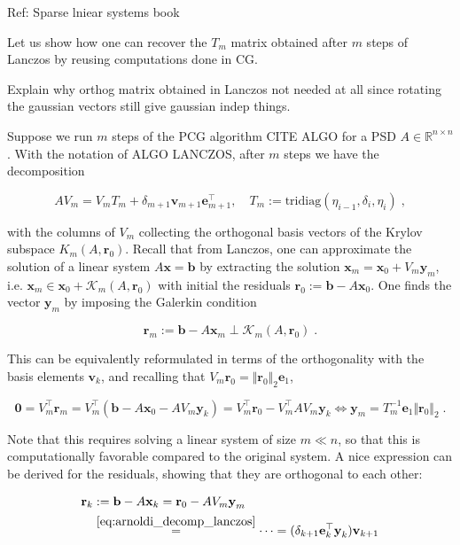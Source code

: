 \documentclass{article}
\newcommand{\vect}[1]{\boldsymbol{\mathbf{#1}}}
\newcommand{\R}{\mathbb R}
\newcommand{\norm}[1]{\Vert #1 \Vert}
\begin{document}
Ref: Sparse lniear systems book


Let us show how one can recover the $T_m$ matrix obtained after $m$ steps of Lanczos by reusing computations done in CG. 

Explain why orthog matrix obtained in Lanczos not needed at all since rotating the gaussian vectors still give gaussian indep things.

Suppose we run $m$ steps of the PCG algorithm CITE ALGO for a PSD $A \in \R^{n\times n}$. With the notation of ALGO LANCZOS, after $m$ steps we have the decomposition

\begin{equation} \label{eq:arnoldi_decomp_lanczos}
    A V_m = V_m T_m + \delta_{m+1} \vect v_{m+1} \vect e_{m+1}^\top, \quad T_m := \text{tridiag}(\eta_{i-1}, \delta_i, \eta_i) \; ,
\end{equation}

with the columns of $V_m$ collecting the orthogonal basis vectors of the Krylov subspace $K_m(A, \vect r_0)$. Recall that from Lanczos, one can approximate the solution of a linear system $A\vect x = \vect b$ by extracting the solution $\vect x_m = \vect x_0 + V_m \vect y_m$, i.e. $\vect x_m \in \vect x_0 + \mathcal K_m(A, \vect r_0)$ with initial the residuals $\vect r_0 := \vect b - A \vect x_0$. One finds the vector $\vect y_m$ by imposing the Galerkin condition 

\begin{equation}
    \vect r_m := \vect b - A \vect x_m \perp \mathcal K_m(A, \vect r_0) \; .
\end{equation}

This can be equivalently reformulated in terms of the orthogonality with the basis elements $\vect v_k$, and recalling that $V_m \vect r_0 = \Vert \vect r_0 \Vert_2 \vect e_1$,

\begin{equation*}
    \vect 0 = V_m^\top \vect r_m = V_m^\top (\vect b - A \vect x_0 - A V_m \vect y_k) = V_m^\top \vect r_0 - V_m^\top A V_m \vect y_k 
    \iff \vect y_m = T_m^{-1} \vect e_1 \norm{\vect r_0}_2 \; .
\end{equation*}

Note that this requires solving a linear system of size $m \ll n$, so that this is computationally favorable compared to the original system. A nice expression can be derived for the residuals, showing that they are orthogonal to each other:

\begin{align}
    \vect r_k &:= \vect b - A \vect x_k = \vect r_0 - A V_m \vect y_m\\
    &\stackrel{\eqref{eq:arnoldi_decomp_lanczos}}{=} \dots = (\delta_{k+1} \vect e_k^\top \vect y_k) \vect v_{k+1} \label{eq:lanczos_residuals_basis_vec}
\end{align}
\end{document}
